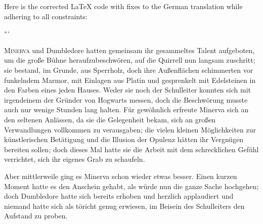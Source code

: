 Here is the corrected LaTeX code with fixes to the German translation while adhering to all constraints:

```

\lettrine{M}{inerva} und Dumbledore hatten gemeinsam ihr gesammeltes Talent aufgeboten, um die große Bühne heraufzubeschwören, auf die Quirrell nun langsam zuschritt; sie bestand, im Grunde, aus Sperrholz, doch ihre Außenflächen schimmerten vor funkelndem Marmor, mit Einlagen aus Platin und gesprenkelt mit Edelsteinen in den Farben eines jeden Hauses. Weder sie noch der Schulleiter konnten sich mit irgendeinem der Gründer von Hogwarts messen, doch die Beschwörung musste auch nur wenige Stunden lang halten. Für gewöhnlich erfreute Minerva sich an den seltenen Anlässen, da sie die Gelegenheit bekam, sich an großen Verwandlungen vollkommen zu verausgaben; die vielen kleinen Möglichkeiten zur künstlerischen Betätigung und die Illusion der Opulenz hätten ihr Vergnügen bereiten sollen; doch dieses Mal hatte sie die Arbeit mit dem schrecklichen Gefühl verrichtet, sich ihr eigenes Grab zu schaufeln.

Aber mittlerweile ging es Minerva schon wieder etwas besser. Einen kurzen Moment hatte es den Anschein gehabt, als würde nun die ganze Sache hochgehen; doch Dumbledore hatte sich bereits erhoben und herzlich applaudiert und niemand hatte sich als töricht genug erwiesen, im Beisein des Schulleiters den Aufstand zu proben.

